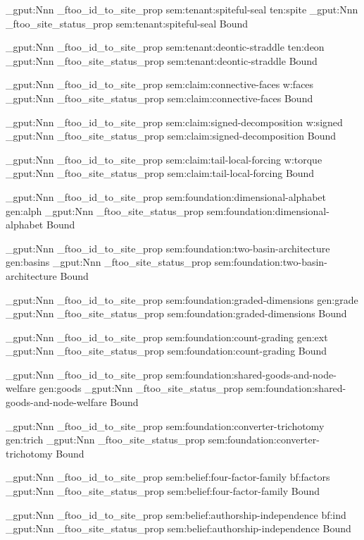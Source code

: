 \prop_gput:Nnn \g_ftoo_id_to_site_prop { sem:tenant:spiteful-seal } { ten:spite }
\prop_gput:Nnn \g_ftoo_site_status_prop { sem:tenant:spiteful-seal } { Bound }

\prop_gput:Nnn \g_ftoo_id_to_site_prop { sem:tenant:deontic-straddle } { ten:deon }
\prop_gput:Nnn \g_ftoo_site_status_prop { sem:tenant:deontic-straddle } { Bound }

\prop_gput:Nnn \g_ftoo_id_to_site_prop { sem:claim:connective-faces } { w:faces }
\prop_gput:Nnn \g_ftoo_site_status_prop { sem:claim:connective-faces } { Bound }

\prop_gput:Nnn \g_ftoo_id_to_site_prop { sem:claim:signed-decomposition } { w:signed }
\prop_gput:Nnn \g_ftoo_site_status_prop { sem:claim:signed-decomposition } { Bound }

\prop_gput:Nnn \g_ftoo_id_to_site_prop { sem:claim:tail-local-forcing } { w:torque }
\prop_gput:Nnn \g_ftoo_site_status_prop { sem:claim:tail-local-forcing } { Bound }

\prop_gput:Nnn \g_ftoo_id_to_site_prop { sem:foundation:dimensional-alphabet } { gen:alph }
\prop_gput:Nnn \g_ftoo_site_status_prop { sem:foundation:dimensional-alphabet } { Bound }

\prop_gput:Nnn \g_ftoo_id_to_site_prop { sem:foundation:two-basin-architecture } { gen:basins }
\prop_gput:Nnn \g_ftoo_site_status_prop { sem:foundation:two-basin-architecture } { Bound }

\prop_gput:Nnn \g_ftoo_id_to_site_prop { sem:foundation:graded-dimensions } { gen:grade }
\prop_gput:Nnn \g_ftoo_site_status_prop { sem:foundation:graded-dimensions } { Bound }

\prop_gput:Nnn \g_ftoo_id_to_site_prop { sem:foundation:count-grading } { gen:ext }
\prop_gput:Nnn \g_ftoo_site_status_prop { sem:foundation:count-grading } { Bound }

\prop_gput:Nnn \g_ftoo_id_to_site_prop { sem:foundation:shared-goods-and-node-welfare } { gen:goods }
\prop_gput:Nnn \g_ftoo_site_status_prop { sem:foundation:shared-goods-and-node-welfare } { Bound }

\prop_gput:Nnn \g_ftoo_id_to_site_prop { sem:foundation:converter-trichotomy } { gen:trich }
\prop_gput:Nnn \g_ftoo_site_status_prop { sem:foundation:converter-trichotomy } { Bound }

\prop_gput:Nnn \g_ftoo_id_to_site_prop { sem:belief:four-factor-family } { bf:factors }
\prop_gput:Nnn \g_ftoo_site_status_prop { sem:belief:four-factor-family } { Bound }

\prop_gput:Nnn \g_ftoo_id_to_site_prop { sem:belief:authorship-independence } { bf:ind }
\prop_gput:Nnn \g_ftoo_site_status_prop { sem:belief:authorship-independence } { Bound }

